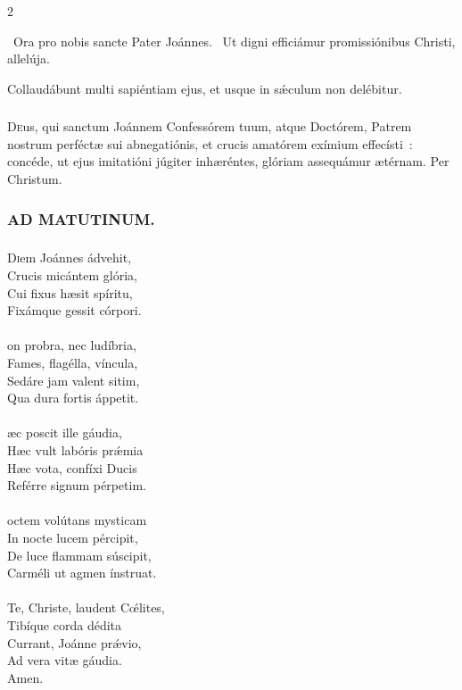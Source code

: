 \documentclass[9pt,twoside]{extarticle}
\begin{document}
\begin{multicols}{2}
\begin{tightlist}{}
\item {}~Ora pro nobis sancte Pater Joánnes. ~Ut digni efficiámur promissiónibus Christi, allelúja. 
\item {} Collaudábunt multi sapiéntiam ejus, et usque in sǽculum non delébitur.
\end{tightlist}

\subsubsection*{\center {}}
\lettrine{D}eus, qui sanctum Joánnem Confessórem tuum, atque Doctórem, Patrem nostrum perféctæ sui abnegatiónis, et crucis amatórem exímium effecísti~: concéde, ut ejus imitatióni júgiter inhæréntes, glóriam assequámur ætérnam. Per Christum.

\subsubsection*{\center \textsc{AD MATUTINUM.}}
\subsubsection*{\center{}}
\lettrine{D}iem Joánnes ádvehit,\\ Crucis micántem glória,\\ Cui fixus hæsit spíritu,\\ Fixámque gessit córpori.\\
\\
on probra, nec ludíbria,\\ Fames, flagélla, víncula,\\ Sedáre jam valent sitim,\\ Qua dura fortis áppetit.\\
\\
æc poscit ille gáudia,\\ Hæc vult labóris prǽmia\\ Hæc vota, confíxi Ducis\\ Reférre signum pérpetim.\\
\\
octem volútans mysticam\\ In nocte lucem pércipit,\\ De luce flammam súscipit,\\ Carméli ut agmen ínstruat.\\
\\
Te, Christe, laudent Cœ́lites,\\ Tibíque corda dédita\\ Currant, Joánne prǽvio,\\ Ad vera vitæ gáudia.\\
Amen.


\end{multicols}
\end{document}

